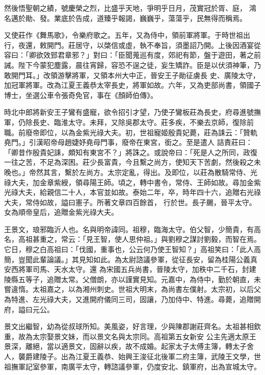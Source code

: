 \begin{pinyinscope}
 然後悟聖朝之績，號慶榮之烈，比盛乎天地，爭明乎日月，茂實冠於胥、庭，
 鴻名邁於勛、發。業底於告成，道臻乎報謁，巍巍乎，蕩蕩乎，民無得而稱焉。



 又使莊作《舞馬歌》，令樂府歌之。五年，又為侍中，領前軍將軍。于時世祖出行，夜還，敕開門。莊居守，以棨信或虛，執不奉旨，須墨詔乃開。上後因酒宴從容曰：「卿欲效郅君章邪？」對曰：「臣聞蒐巡有度，郊祀有節，盤于遊田，著之前誡。陛下今蒙犯塵露，晨往宵歸，容恐不逞之徒，妄生矯詐。臣是以伏須神筆，乃敢開門耳。」改領游擊將軍，又領本州大中正，晉安王子勛征虜長
 史、廣陵太守，加冠軍將軍。改為江夏王義恭太宰長史，將軍如故。六年，又為吏部尚書，領國子博士，坐選公車令張奇免官，事在《顏師伯傳》。



 時北中郎將新安王子鸞有盛寵，欲令招引才望，乃使子鸞板莊為長史，府尋進號撫軍，仍除長史、臨淮太守。未拜，又除吳郡太守。莊多疾，不樂去京師，復除前職。前廢帝即位，以為金紫光祿大夫。初，世祖寵姬殷貴妃薨，莊為誄云：「贊軌堯門。」引漢昭帝母趙婕妤堯母門事，廢帝在東宮，銜之。至是遣人
 詰責莊曰：「卿昔作殷貴妃誄，頗知有東宮不？」將誅之。或說帝曰：「死是人之所同，政復一往之苦，不足為深困。莊少長富貴，今且繫之尚方，使知天下苦劇，然後殺之未晚也。」帝然其言，繫於左尚方。太宗定亂，得出。及即位，以莊為散騎常侍、光祿大夫，加金章紫綬，領尋陽王師。頃之，轉中書令，常侍、王師如故。尋加金紫光祿大夫，給親信二十人，本官並如故。泰始二年，卒，時年四十六，追贈右光祿大夫，常侍如故，謚曰憲子。所著文章四百餘首，
 行於世。長子颺，晉平太守。女為順帝皇后，追贈金紫光祿大夫。



 王景文，琅邪臨沂人也。名與明帝諱同。祖穆，臨海太守。伯父智，少簡貴，有高名，高祖甚重之，常云：「見王智，使人思仲祖。」與劉穆之謀討劉毅，而智在焉。它日，穆之白高祖曰：「伐國，重事也，公云何乃使王智知？」高祖笑曰：「此人高簡，豈聞此輩論議。」其見知如此。為太尉諮議參軍，從征長安，留為桂陽公義真安西將軍司馬、天水太守。還
 為宋國五兵尚書，晉陵太守，加秩中二千石，封建陵縣五等子，追贈太常。父僧朗，亦以謹實見知。元嘉中，為侍中，勤於朝直，未嘗違惰。太祖嘉之，以為湘州刺史。世祖大明末，為尚書左僕射。太宗初，以后父為特進、左光祿大夫，又進開府儀同三司，固讓，乃加侍中、特進。尋薨，追贈開府，謚曰元公。



 景文出繼智，幼為從叔球所知。美風姿，好言理，少與陳郡謝莊齊名。太祖甚相欽重，故為太宗娶景文妹，而以景文名與太宗同。高祖第五女新安
 公主先適太原王景深，離絕，當以適景文，固辭以疾，故不成婚。起家太子太傅主簿，轉太子舍人，襲爵建陵子。出為江夏王義恭、始興王浚征北後軍二府主簿，武陵王文學，世祖撫軍記室參軍，南廣平太守，轉諮議參軍，仍度安北、鎮軍府，出為宣城太守。




\end{pinyinscope}
